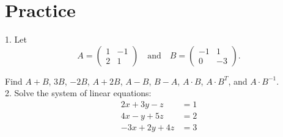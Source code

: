 \documentclass[11pt]{article}
\begin{document}
\section{Practice}
1. Let
\[
A =
\begin{pmatrix}
1 & -1 \\
2 & 1
\end{pmatrix}
\quad \text{and} \quad
B =
\begin{pmatrix}
-1 & 1 \\
0 & -3
\end{pmatrix}.
\]

Find \( A + B \), \( 3B \), \( -2B \), \( A + 2B \), \( A - B \), \( B - A \), \( A \cdot B \), \(A \cdot B^T\), and \(A \cdot B^{-1}\). \\


2. Solve the system of linear equations:
\[
\begin{aligned}
2x + 3y - z &= 1 \\
4x - y + 5z &= 2 \\
-3x + 2y + 4z &= 3
\end{aligned}
\]
\end{document}

